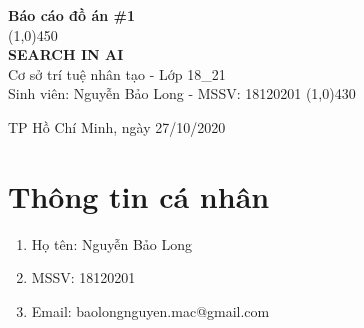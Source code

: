 \documentclass[a4paper, 12pt]{article}
\begin{document}
    \begin{titlepage}
        \begin{center}

            \vspace*{1cm}
            \Large\textbf{Báo cáo đồ án \#1}\\

            \vfill
            \line(1,0){450}\\[4mm]
            \LARGE\textbf{\MakeUppercase{Search In AI}}\\[3mm]
            \Large{Cơ sở trí tuệ nhân tạo - Lớp 18\_21}\\[3mm]
            \large{Sinh viên: Nguyễn Bảo Long - MSSV: 18120201}
            \line(1,0){430}\\
            \vfill

            \vfill
            TP Hồ Chí Minh, ngày 27/10/2020
        \end{center}
    \end{titlepage}

    \tableofcontents
    \thispagestyle{empty}
    \clearpage

    \section{Thông tin cá nhân}
    \begin{enumerate}
        \item Họ tên: Nguyễn Bảo Long
        \item MSSV: 18120201
        \item Email: baolongnguyen.mac@gmail.com
    \end{enumerate}
    \clearpage
\end{document}
